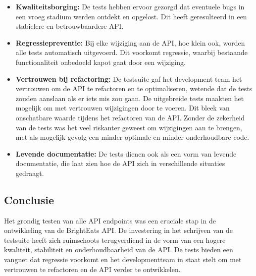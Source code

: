 \begin{itemize}
\item \textbf{Kwaliteitsborging:} De tests hebben ervoor gezorgd dat eventuele bugs in een vroeg stadium werden ontdekt en opgelost. Dit heeft geresulteerd in een stabielere en betrouwbaardere API.
\item \textbf{Regressiepreventie:} Bij elke wijziging aan de API, hoe klein ook, worden alle tests automatisch uitgevoerd. Dit voorkomt regressie, waarbij bestaande functionaliteit onbedoeld kapot gaat door een wijziging.
\item \textbf{Vertrouwen bij refactoring:} De testsuite gaf het development team het vertrouwen om de API te refactoren en te optimaliseren, wetende dat de tests zouden aanslaan als er iets mis zou gaan. De uitgebreide tests maakten het mogelijk om met vertrouwen wijzigingen door te voeren. Dit bleek van onschatbare waarde tijdens het refactoren van de API. Zonder de zekerheid van de tests was het veel riskanter geweest om wijzigingen aan te brengen, met als mogelijk gevolg een minder optimale en minder onderhoudbare code.
\item \textbf{Levende documentatie:} De tests dienen ook als een vorm van levende documentatie, die laat zien hoe de API zich in verschillende situaties gedraagt.
\end{itemize}

\subsection{Conclusie}

Het grondig testen van alle API endpoints was een cruciale stap in de ontwikkeling van de BrightEats API. De investering in het schrijven van de testsuite heeft zich ruimschoots terugverdiend in de vorm van een hogere kwaliteit, stabiliteit en onderhoudbaarheid van de API. De tests bieden een vangnet dat regressie voorkomt en het developmentteam in staat stelt om met vertrouwen te refactoren en de API verder te ontwikkelen.

